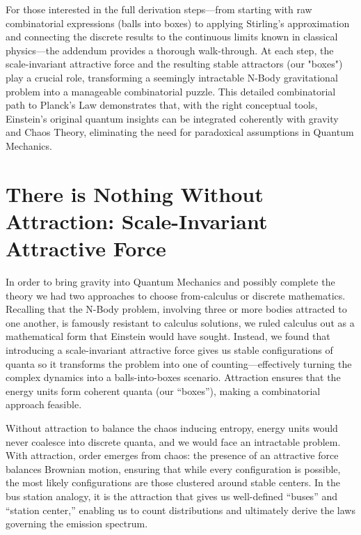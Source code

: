 \documentclass{article}
\begin{document}
For those interested in the full derivation steps—from starting with raw combinatorial expressions (balls into boxes) to applying Stirling’s approximation and connecting the discrete results to the continuous limits known in classical physics—the addendum provides a thorough walk-through. At each step, the scale-invariant attractive force and the resulting stable attractors (our "boxes") play a crucial role, transforming a seemingly intractable N-Body gravitational problem into a manageable combinatorial puzzle. This detailed combinatorial path to Planck’s Law demonstrates that, with the right conceptual tools, Einstein’s original quantum insights can be integrated coherently with gravity and Chaos Theory, eliminating the need for paradoxical assumptions in Quantum Mechanics.

\section*{There is Nothing Without Attraction: Scale-Invariant Attractive Force}

In order to bring gravity into Quantum Mechanics and possibly complete the theory we had two approaches to choose from-calculus or discrete mathematics. Recalling that the N-Body problem, involving three or more bodies attracted to one another, is famously resistant to calculus solutions, we ruled calculus out as a mathematical form that Einstein would have sought. Instead, we found that introducing a scale-invariant attractive force gives us stable configurations of quanta so it transforms the problem into one of counting—effectively turning the complex dynamics into a balls-into-boxes scenario. Attraction ensures that the energy units form coherent quanta (our “boxes”), making a combinatorial approach feasible.

Without attraction to balance the chaos inducing entropy, energy units would never coalesce into discrete quanta, and we would face an intractable problem. With attraction, order emerges from chaos: the presence of an attractive force balances Brownian motion, ensuring that while every configuration is possible, the most likely configurations are those clustered around stable centers. In the bus station analogy, it is the attraction that gives us well-defined “buses” and “station center,” enabling us to count distributions and ultimately derive the laws governing the emission spectrum.
\end{document}
